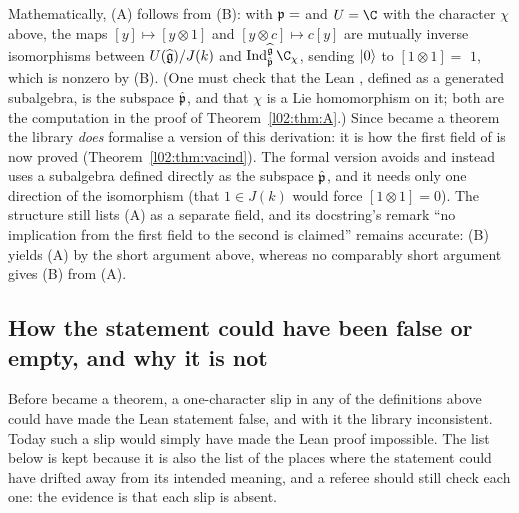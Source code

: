 \begin{remark}\label{l02:rem:AfromB}
Mathematically, (A) follows from (B): with $\mathfrak{p} = $  and $U = \C$ with the character
$\chi$ above, the maps $[y]\mapsto[y\otimes1]$ and $[y\otimes c]\mapsto c[y]$ are mutually inverse
isomorphisms between $U(\widehat{\mathfrak{g}})/J(k)$ and $\ltwoInd_{\hat{\ltwop}}^{\ltwoghat}\C_\chi$, sending $|0\rangle$ to
$[1\otimes1] = $  $1$, which is nonzero by (B). (One must check that the Lean
, defined as a generated subalgebra, is the subspace $\hat{\mathfrak{p}}$, and that $\chi$ is a
Lie homomorphism on it; both are the computation in the proof of Theorem~\ref{l02:thm:A}.) Since
 became a theorem the library \emph{does} formalise a version of this derivation: it is how the
first field of  is now proved (Theorem~\ref{l02:thm:vacind}). The formal version avoids
 and instead uses a subalgebra  defined directly as the subspace
$\hat{\mathfrak{p}}$, and it needs only one direction of the isomorphism (that $1\in J(k)$ would force
$[1\otimes1] = 0$). The structure  still lists (A) as a separate field, and its
docstring's remark ``no implication from the first field to the second is claimed'' remains accurate:
(B) yields (A) by the short argument above, whereas no comparably short argument gives (B) from (A).
\end{remark}

\subsection{How the statement could have been false or empty, and why it is not}

Before  became a theorem, a one-character slip in any of the definitions above could have made the
Lean statement false, and with it the library inconsistent. Today such a slip would simply have made the
Lean proof impossible. The list below is kept because it is also the list of the places where the
statement could have drifted away from its intended meaning, and a referee should still check each one:
the evidence is that each slip is absent.

